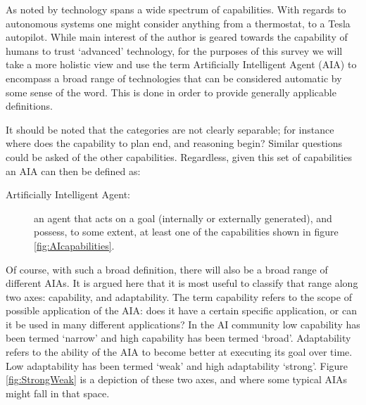     As noted by \citet{Tripp2011-cq} technology spans a wide spectrum of capabilities. With regards to autonomous systems one might consider anything from a thermostat, to a Tesla autopilot. While main interest of the author is geared towards the capability of humans to trust `advanced' technology, for the purposes of this survey we will take a more holistic view and use the term Artificially Intelligent Agent (AIA) to encompass a broad range of technologies that can be considered automatic by some sense of the word. This is done in order to provide generally applicable definitions.

    It should be noted that the categories are not clearly separable; for instance where does the capability to plan end, and reasoning begin? Similar questions could be asked of the other capabilities. Regardless, given this set of capabilities an AIA can then be defined as:
    
    \begin{description}
        \item[Artificially Intelligent Agent:] an agent that acts on a goal (internally or externally generated), and possess, to some extent, at least one of the capabilities shown in figure \ref{fig:AIcapabilities}.
    \end{description}

    Of course, with such a broad definition, there will also be a broad range of different AIAs. It is argued here that it is most useful to classify that range along two axes: capability, and adaptability. The term capability refers to the scope of possible application of the AIA: does it have a certain specific application, or can it be used in many different applications? In the AI community low capability has been termed `narrow' and high capability has been termed `broad'. Adaptability refers to the ability of the AIA to become better at executing its goal over time. Low adaptability has been termed `weak' and high adaptability `strong'. Figure \ref{fig:StrongWeak} is a depiction of these two axes, and where some typical AIAs might fall in that space.

